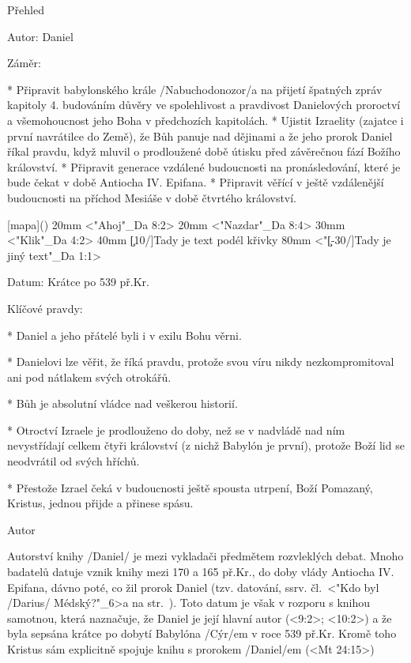 Přehled

Autor: Daniel

Záměr:

\begitems
* Připravit babylonského krále \x/Nabuchodonozor/a na přijetí špatných zpráv kapitoly 4. budováním důvěry ve spolehlivost a pravdivost Danielových proroctví a všemohoucnost jeho Boha v předchozích kapitolách. 
* Ujistit Izraelity (zajatce i první navrátilce do Země), že Bůh panuje nad dějinami a že jeho prorok Daniel říkal pravdu, když mluvil o prodloužené době útisku před závěrečnou fází Božího království. 
* Připravit generace vzdálené budoucnosti na pronásledování, které je bude čekat v době Antiocha IV. Epifana.
* Připravit věřící v ještě vzdálenější budoucnosti na příchod Mesiáše v době čtvrtého království.
\enditems 


[mapa](){
  \Heros \cond {}\rm  
  \puttext 60mm 20mm {<"Ahoj"_Da 8:2>}
  \puttext 80mm 20mm {<"Nazdar"_Da 8:4>}
  \puttext 60mm 30mm {<"Klik"_Da 4:2>}
  \puttext 80mm 40mm {\c[10/\kern1pt]{Tady je text podél křivky}}
  \puttext 120mm 80mm {<"\c[-30/\kern1pt]{Tady je jiný text}"_Da 1:1>}
}

Datum: Krátce po 539 př.Kr.

Klíčové pravdy:

\begitems
* Daniel a jeho přátelé byli i v exilu Bohu věrni.

* Danielovi lze věřit, že říká pravdu, protože svou víru nikdy nezkompromitoval ani pod nátlakem svých otrokářů.

* Bůh je absolutní vládce nad veškerou historií.

* Otroctví Izraele je prodlouženo do doby, než se v nadvládě nad ním nevystřídají celkem čtyři  království (z nichž Babylón je první), protože Boží lid se neodvrátil od svých hříchů. 

* Přestože Izrael čeká v budoucnosti ještě spousta utrpení, Boží Pomazaný, Kristus, jednou přijde a přinese spásu.

\enditems

Autor

Autorství knihy \x/Daniel/ je mezi vykladači předmětem rozvleklých debat.
Mnoho badatelů datuje vznik knihy mezi 170 a 165 př.Kr., do doby vlády Antiocha IV. Epifana, dávno poté, co žil prorok Daniel (tzv.  datování, ssrv. čl.~<"Kdo byl \x/Darius/ Médský?"_6>a na str.~\pg). 
Toto datum je však v rozporu s knihou samotnou, která naznačuje, že Daniel je její hlavní autor (<9:2>; <10:2>) a že byla sepsána krátce po dobytí Babylóna \x/Cýr/em v roce 539 př.Kr. Kromě toho  Kristus sám explicitně spojuje knihu s prorokem \x/Daniel/em (<Mt 24:15>) 

